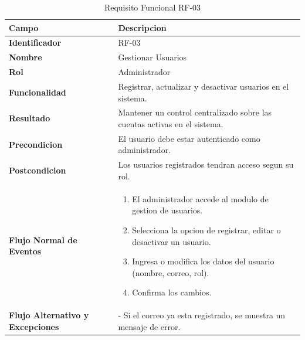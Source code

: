 \begin{table}[htb!]
    \centering
    \caption{Requisito Funcional RF-03}
\begin{tabular}{|p{3cm}|p{12cm}|}
\hline
\textbf{Campo} & \textbf{Descripcion} \\ \hline
\textbf{Identificador} & RF-03 \\ \hline
\textbf{Nombre} & Gestionar Usuarios \\ \hline
\textbf{Rol} & Administrador \\ \hline
\textbf{Funcionalidad} & Registrar, actualizar y desactivar usuarios en el sistema. \\ \hline
\textbf{Resultado} & Mantener un control centralizado sobre las cuentas activas en el sistema. \\ \hline
\textbf{Precondicion} & El usuario debe estar autenticado como administrador. \\ \hline
\textbf{Postcondicion} & Los usuarios registrados tendran acceso segun su rol. \\ \hline
\textbf{Flujo Normal de Eventos} & 
\begin{enumerate}
    \item El administrador accede al modulo de gestion de usuarios. 
    \item Selecciona la opcion de registrar, editar o desactivar un usuario. 
    \item Ingresa o modifica los datos del usuario (nombre, correo, rol). 
    \item Confirma los cambios.
    
\end{enumerate}
\\ \hline
\textbf{Flujo Alternativo y Excepciones} & 
- Si el correo ya esta registrado, se muestra un mensaje de error. \\ \hline
\end{tabular}
\end{table}
\FloatBarrier

